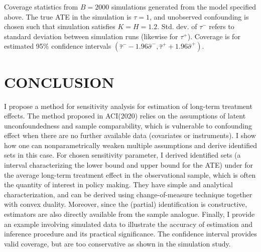 \documentclass[12pt]{article}
\begin{document}
    \begin{table}
        \centering
    \begin{threeparttable}
    \caption{Monte Carlo Results: $B = 2000, \tau = 1, K = H = 1.2$}
		
        \label{tab:tab2}
    \begin{tablenotes}
      \small
      \item Coverage statistics from $B = 2000$ simulations generated from the model specified above. The true ATE in the simulation is $\tau = 1$, and unobserved confounding is chosen such that simulation satisfies $K = H = 1.2$. Std. dev. of $\tau^-$ refers to standard deviation between simulation runs (likewise for $\tau^+$). Coverage is for estimated 95\% confidence intervals $(\hat{\tau}^- - 1.96 \hat{\sigma}^-, \hat{\tau}^+ + 1.96 \hat{\sigma}^+)$.
    \end{tablenotes}
  \end{threeparttable}
  \end{table}

  \section{CONCLUSION}

  I propose a method for sensitivity analysis for estimation of long-term treatment effects.
  The method proposed in ACI(2020) relies on the assumptions of latent unconfoundedness and sample comparability, which is vulnerable to confounding effect when there are no further available data (covariates or instruments).
  I show how one can nonparametrically weaken multiple assumptions and derive identified sets in this case. For chosen sensitivity parameter, I derived identified sets (a interval characterizing the lower bound and upper bound for the ATE) under for the average long-term treatment effect in the observational sample, which is often the quantity of interest in policy making.
  They have simple and analytical characterization, and can be derived using change-of-measure technique together with convex duality. 
  Moreover, since the (partial) identification is constructive, estimators are also directly available from the sample analogue.
  Finally, I provide an example involving simulated data to illustrate the accuracy of estimation and inference procedure and its practical significance. The confidence interval provides valid coverage, but are too conservative as shown in the simulation study.
\end{document}
